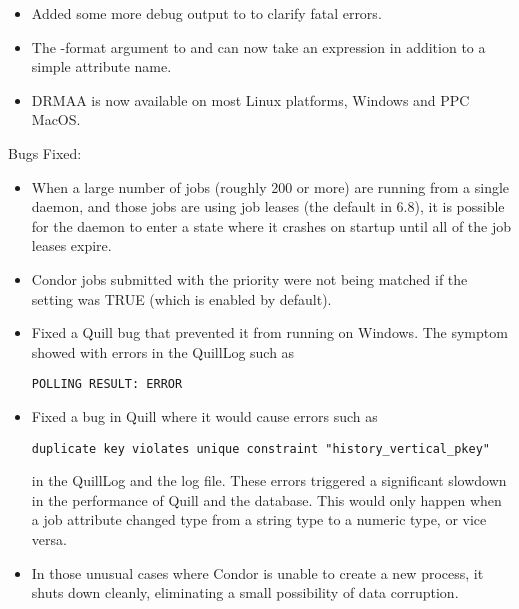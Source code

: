 \begin{itemize}
\item Added some more debug output to  to clarify
fatal errors.

\item The -format argument to  and  can now take an expression in addition to a simple attribute name.

\item DRMAA is now available on most Linux platforms, Windows and PPC MacOS.

\end{itemize}

\noindent Bugs Fixed:

\begin{itemize}

\item When a large number of jobs (roughly 200 or more) are running from a
single  daemon, and those jobs are using job leases
(the default in 6.8), it is
possible for the  daemon to enter a state 
where it crashes on startup until all of
the job leases expire.

\item Condor jobs submitted with the  priority were
  not being matched if the 
  setting was TRUE (which is enabled by default).

\item Fixed a Quill bug that prevented it from running on Windows.  The
symptom showed with errors in the QuillLog such as
\begin{verbatim}
POLLING RESULT: ERROR
\end{verbatim}

\item Fixed a bug in Quill where it would cause errors such as
\begin{verbatim}
duplicate key violates unique constraint "history_vertical_pkey"
\end{verbatim}
in the QuillLog and the  log file.  These errors
triggered
a significant slowdown in the performance of Quill and the database.  This
would only happen when a job attribute changed type from a string
type to a numeric type, or vice versa.

\item In those unusual cases where Condor is unable to create a new process,
it shuts down cleanly, eliminating a small possibility of data corruption.


\end{itemize}
